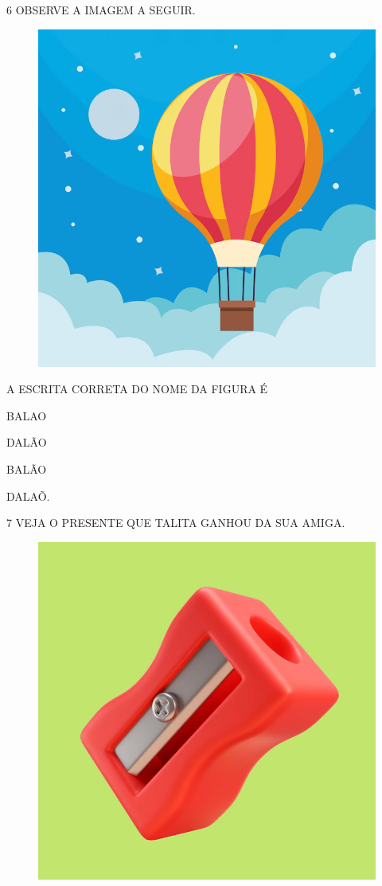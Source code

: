 \num{6} OBSERVE A IMAGEM A SEGUIR.

\begin{figure}[H]
\centering
\includegraphics[width=.45\textwidth]{./media/image232.png}
\end{figure}

A ESCRITA CORRETA DO NOME DA FIGURA É

\begin{escolha}

\item BALAO

\item DALÃO

\item BALÃO

\item DALAÕ.

\end{escolha}

\num{7} VEJA O PRESENTE QUE TALITA GANHOU DA SUA AMIGA.

\begin{figure}[H]
\centering
\includegraphics[width=.7\textwidth]{./media/image233.png}
\end{figure}

